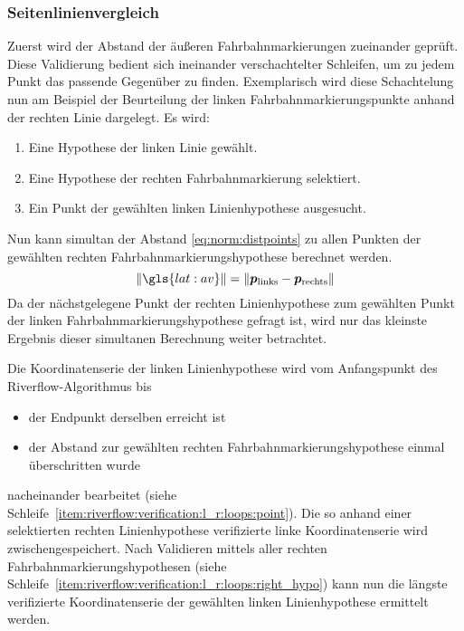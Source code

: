 \subsubsection{Seitenlinienvergleich \dcsecondauthorshort} 
\label{sssec:fahrspurerkennung:riverflow:verifikation:seitenlinienvergleich}
Zuerst wird der Abstand der äußeren Fahrbahnmarkierungen zueinander geprüft. Diese Validierung bedient sich ineinander verschachtelter Schleifen, um zu jedem Punkt das passende Gegenüber zu finden. Exemplarisch wird diese Schachtelung nun am Beispiel der Beurteilung der linken Fahrbahnmarkierungspunkte anhand der rechten Linie dargelegt. Es wird:
\begin{enumerate}
\item 
Eine Hypothese der linken Linie gewählt.
\item \label{item:riverflow:verification:l_r:loops:right_hypo}
Eine Hypothese der rechten Fahrbahnmarkierung selektiert.
\item \label{item:riverflow:verification:l_r:loops:point}
Ein Punkt der gewählten linken Linienhypothese ausgesucht.
\end{enumerate}
Nun kann simultan der Abstand  \eqref{eq:norm:distpoints} 
zu allen Punkten der gewählten rechten Fahrbahnmarkierungshypothese berechnet werden. 
\begin{equation}
\label{eq:norm:distpoints} 
\nrm{\gls{lat:av}} = \nrm{\pnt{p_{\text{links}}} - \pnt{p_{\text{rechts}}}} 
\end{equation}
Da der nächstgelegene Punkt der rechten Linienhypothese zum gewählten Punkt der linken Fahrbahnmarkierungshypothese gefragt ist, wird nur das kleinste Ergebnis dieser simultanen Berechnung weiter betrachtet.

Die Koordinatenserie der linken Linienhypothese wird vom Anfangspunkt des Riverflow-Algorithmus bis
\begin{itemize}
\item der Endpunkt derselben erreicht ist 
\item der Abstand zur gewählten rechten Fahrbahnmarkierungshypothese einmal überschritten wurde
\end{itemize}
nacheinander bearbeitet (siehe Schleife~\ref{item:riverflow:verification:l_r:loops:point}). Die so anhand einer selektierten rechten Linienhypothese verifizierte linke Koordinatenserie wird zwischengespeichert. 
Nach Validieren mittels aller rechten Fahrbahnmarkierungshypothesen (siehe Schleife~\ref{item:riverflow:verification:l_r:loops:right_hypo}) kann nun die längste verifizierte Koordinatenserie der gewählten linken Linienhypothese ermittelt werden.

